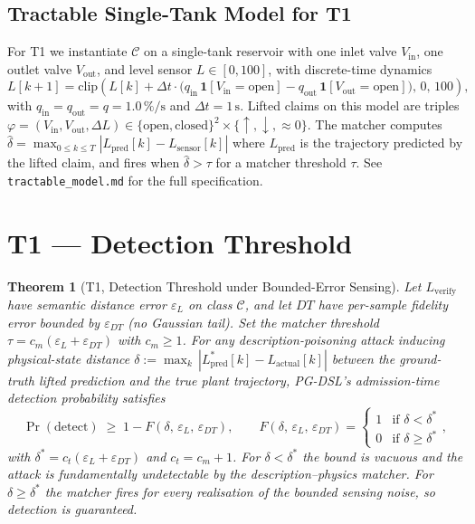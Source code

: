 \documentclass[11pt]{article}
\newtheorem{theorem}{Theorem}
\begin{document}
\subsection{Tractable Single-Tank Model for T1}

For T1 we instantiate $\mathcal{C}$ on a single-tank reservoir with one
inlet valve $V_{\text{in}}$, one outlet valve $V_{\text{out}}$, and level
sensor $L \in [0, 100]$, with discrete-time dynamics
\[
L[k+1] = \mathrm{clip}\!\left(L[k] + \Delta t \cdot
   \big(q_{\text{in}}\,\mathbf{1}[V_{\text{in}}\!=\!\text{open}]
      - q_{\text{out}}\,\mathbf{1}[V_{\text{out}}\!=\!\text{open}]\big),\, 0,\, 100\right),
\]
with $q_{\text{in}}=q_{\text{out}}=q=1.0\,\%/\mathrm{s}$ and $\Delta t = 1\,\mathrm{s}$.
Lifted claims on this model are triples
$\varphi = (V_{\text{in}}, V_{\text{out}}, \Delta L) \in
 \{\text{open},\text{closed}\}^2 \times \{\uparrow,\downarrow,\approx 0\}$.
The matcher computes
$\hat{\delta} = \max_{0 \leq k \leq T}|L_{\text{pred}}[k] -
                                       L_{\text{sensor}}[k]|$
where $L_{\text{pred}}$ is the trajectory predicted by the lifted claim, and
fires when $\hat{\delta} > \tau$ for a matcher threshold $\tau$. See
\texttt{tractable\_model.md} for the full specification.

\section{T1 --- Detection Threshold}
\label{sec:t1}

\begin{theorem}[T1, Detection Threshold under Bounded-Error Sensing]
\label{thm:t1}
Let $L_{\text{verify}}$ have semantic distance error $\varepsilon_L$ on
class $\mathcal{C}$, and let $\mathit{DT}$ have per-sample fidelity error
bounded by $\varepsilon_{DT}$ (no Gaussian tail). Set the matcher threshold
$\tau = c_m (\varepsilon_L + \varepsilon_{DT})$ with $c_m \geq 1$. For any
description-poisoning attack inducing physical-state distance
$\delta := \max_k\,|L_{\text{pred}}^{*}[k] - L_{\text{actual}}[k]|$ between
the ground-truth lifted prediction and the true plant trajectory, PG-DSL's
admission-time detection probability satisfies
\[
\Pr(\text{detect}) \;\geq\; 1 - F(\delta,\,\varepsilon_L,\,\varepsilon_{DT}),
\qquad
F(\delta,\,\varepsilon_L,\,\varepsilon_{DT}) =
\begin{cases} 1 & \text{if } \delta < \delta^{*} \\
              0 & \text{if } \delta \geq \delta^{*} \end{cases},
\]
with $\delta^{*} = c_t (\varepsilon_L + \varepsilon_{DT})$ and $c_t = c_m + 1$.
For $\delta < \delta^{*}$ the bound is vacuous and the attack is
fundamentally undetectable by the description--physics matcher. For
$\delta \geq \delta^{*}$ the matcher fires for every realisation of the
bounded sensing noise, so detection is guaranteed.
\end{theorem}
\end{document}

